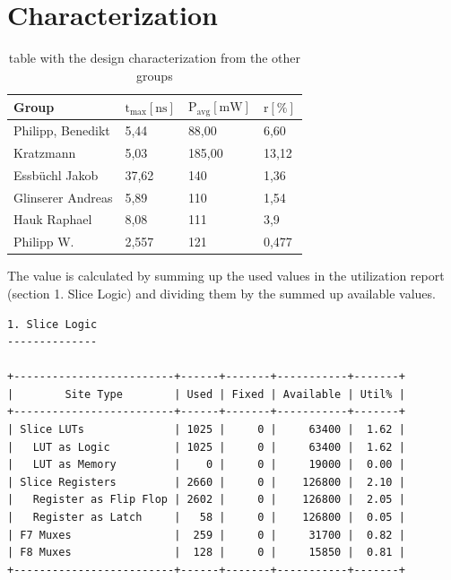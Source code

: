 \documentclass[%
	a4paper,
]
{article}
\begin{document}
\section{Characterization}
\begin{table}[ht]
    \centering
    \begin{tabular}{l|lll}
         Group & $\text{t}_\text{{max}} [\text{ns}]	$ & $\text{P}_\text{avg} [\text{mW}]$ & $\text{r} [\%] $ \\ \hline \hline
        Philipp, Benedikt &	5,44	& 88,00	& 6,60 \\
        Kratzmann &	5,03 &	185,00 & 13,12 \\
        Essbüchl Jakob &	37,62 &	140	& 1,36 \\
        Glinserer Andreas &	5,89 &	110	& 1,54 \\ 
        Hauk Raphael &	8,08 &	111 &	3,9 \\
        Philipp W. &	2,557 &	121 &	0,477\\
        \hline
    \end{tabular}
    \caption{table with the design characterization from the other groups}
    \label{tab:characterization}
\end{table}
The value is calculated by summing up the used values in the utilization report
(section 1. Slice Logic)
and dividing them
by the summed up available values.

\begin{lstlisting}[caption=Relevant part from the report\_utilization command needed for calculating the hardware utilization.,firstnumber=1,label={lst:utilzation}]
1. Slice Logic
--------------

+-------------------------+------+-------+-----------+-------+
|        Site Type        | Used | Fixed | Available | Util% |
+-------------------------+------+-------+-----------+-------+
| Slice LUTs              | 1025 |     0 |     63400 |  1.62 |
|   LUT as Logic          | 1025 |     0 |     63400 |  1.62 |
|   LUT as Memory         |    0 |     0 |     19000 |  0.00 |
| Slice Registers         | 2660 |     0 |    126800 |  2.10 |
|   Register as Flip Flop | 2602 |     0 |    126800 |  2.05 |
|   Register as Latch     |   58 |     0 |    126800 |  0.05 |
| F7 Muxes                |  259 |     0 |     31700 |  0.82 |
| F8 Muxes                |  128 |     0 |     15850 |  0.81 |
+-------------------------+------+-------+-----------+-------+
\end{lstlisting}
\end{document}
